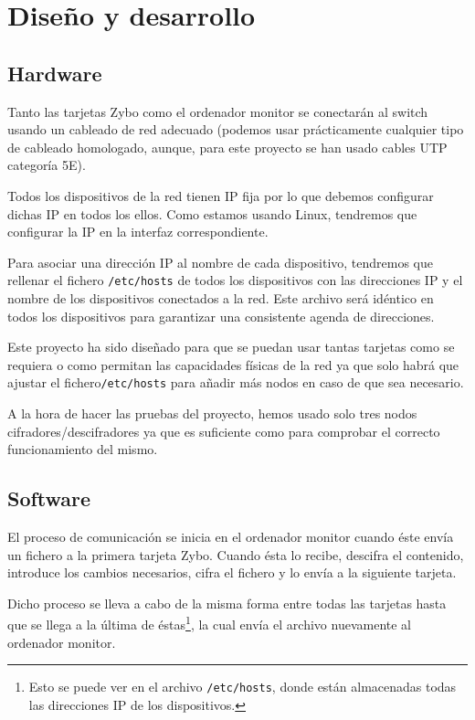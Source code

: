 \section{Diseño y desarrollo}
\subsection{Hardware}
Tanto las tarjetas Zybo como el ordenador monitor se conectarán al switch usando un cableado de red adecuado (podemos usar prácticamente cualquier tipo de cableado homologado, aunque, para este proyecto se han usado cables UTP categoría 5E).

Todos los dispositivos de la red tienen IP fija por lo que debemos configurar dichas IP en todos los ellos. Como estamos usando Linux, tendremos que configurar la IP en la interfaz correspondiente.

Para asociar una dirección IP al nombre de cada dispositivo, tendremos que rellenar el fichero \texttt{/etc/hosts} de todos los dispositivos con las direcciones IP y el nombre de los dispositivos conectados a la red. Este archivo será idéntico en todos los dispositivos para garantizar una consistente agenda de direcciones.

Este proyecto ha sido diseñado para que se puedan usar tantas tarjetas como se requiera o como permitan las capacidades físicas de la red ya que solo habrá que ajustar el fichero\texttt{/etc/hosts} para añadir más nodos en caso de que sea necesario.

A la hora de hacer las pruebas del proyecto, hemos usado solo tres nodos cifradores/descifradores ya que es suficiente como para comprobar el correcto funcionamiento del mismo.

\subsection{Software}
El proceso de comunicación se inicia en el ordenador monitor cuando éste envía un fichero a la primera tarjeta Zybo. Cuando ésta lo recibe, descifra el contenido, introduce los cambios necesarios, cifra el fichero y lo envía a la siguiente tarjeta.

Dicho proceso se lleva a cabo de la misma forma entre todas las tarjetas hasta que se llega a la última de éstas\footnote{Esto se puede ver en el archivo \texttt{/etc/hosts}, donde están almacenadas todas las direcciones IP de los dispositivos.}, la cual envía el archivo nuevamente al ordenador monitor.

